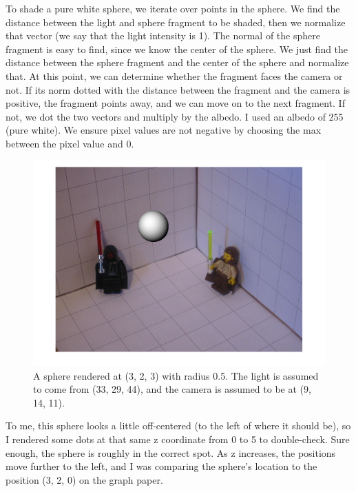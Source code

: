 \documentclass{article}
\begin{document}
To shade a pure white sphere, we iterate over points in the sphere. We find the 
distance between the light and sphere fragment to be shaded, then we normalize 
that vector (we say that the light intensity is 1). The normal of the sphere 
fragment is easy to find, since we know the center of the sphere. We just find 
the distance between the sphere fragment and the center of the sphere and 
normalize that. At this point, we can determine whether the fragment faces the 
camera or not. If its norm dotted with the distance between the fragment and the 
camera is positive, the fragment points away, and we can move on to the next 
fragment. If not, we dot the two vectors and multiply by the albedo. I used 
an albedo of 255 (pure white). We ensure pixel values are not negative by 
choosing the max between the pixel value and 0.

\begin{figure}[!ht]
	\centering
	\includegraphics[width=120mm]{figs/sphere.png}
	\caption{A sphere rendered at (3, 2, 3) with radius 0.5. The light is 
        assumed to come from (33, 29, 44), and the camera is assumed to be at 
        (9, 14, 11).}
\end{figure}

To me, this sphere looks a little off-centered (to the left of where it should 
be), so I rendered some dots at that same z coordinate from 0 to 5 to 
double-check. Sure enough, the sphere is roughly in the correct spot. As z 
increases, the positions move further to the left, and I was comparing the 
sphere's location to the position (3, 2, 0) on the graph paper.
\end{document}
